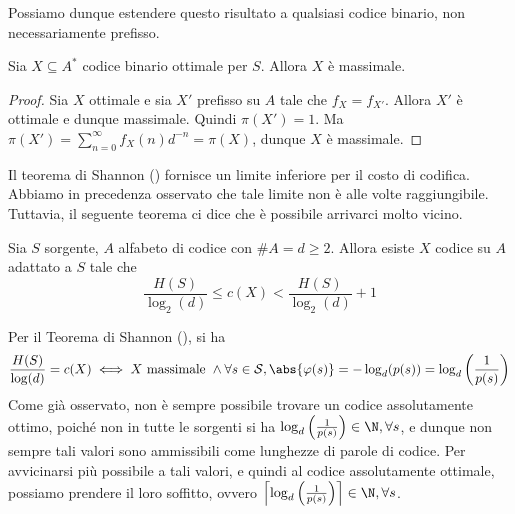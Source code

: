 Possiamo dunque estendere questo risultato a qualsiasi codice binario, non necessariamente prefisso.

\begin{corollary}[label=cor:binary-optimality-maximality]{}
  Sia \(X\subseteq A^{*}\) codice binario ottimale per \(S\). Allora \(X\) è massimale.
\end{corollary}

\begin{proof}
  Sia \(X\) ottimale e sia \(X'\) prefisso su \(A\) tale che \(f_X = f_{X'}\).
  Allora \(X'\) è ottimale e dunque massimale. Quindi \(\pi(X') = 1\).
  Ma \(\pi(X') = \sum_{n=0}^{\infty} f_X(n)d^{-n} = \pi(X)\), dunque \(X\) è massimale.
\end{proof}

Il teorema di Shannon () fornisce un limite inferiore per il costo di codifica. Abbiamo in precedenza osservato che tale limite non è alle volte raggiungibile. Tuttavia, il seguente teorema ci dice che è possibile arrivarci molto vicino.
\begin{theorem}{}
  Sia \(S\) sorgente, \(A\) alfabeto di codice con \(\#A = d \geq 2\). Allora esiste \(X\) codice su \(A\) adattato a \(S\) tale che
  \[\frac{H(S)}{\log_2(d)} \leq c(X) <\frac{H(S)}{\log_2(d)} +1\]
\end{theorem}

Per il Teorema di Shannon (), si ha 
\[\frac{H(S)}{\log(d)} = c(X) \iff X \text{ massimale }\land \forall s \in \SCal, \abs{\varphi(s)}=-\log_d(p(s))=\log_d\left(\frac{1}{p(s)}\right)\]
Come già osservato, non è sempre possibile trovare un codice assolutamente ottimo, poiché non in tutte le sorgenti si ha \(\log_d\left(\frac{1}{p(s)}\right) \in \N, \forall s\), e dunque non sempre tali valori sono ammissibili come lunghezze di parole di codice.
Per avvicinarsi più possibile a tali valori, e quindi al codice assolutamente ottimale, possiamo prendere il loro soffitto, ovvero $\left\lceil \log_d\left(\frac{1}{p(s)}\right)\right\rceil \in \N, \forall s$.

